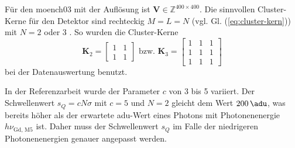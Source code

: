 \noindent
Für den \gls{moench03} mit der Auflösung  ist $\mathbf{V} \in \mathbb{Z}^{400\times 400}$. Die sinnvollen Cluster-Kerne für den Detektor sind rechteckig $M=L=N$ (vgl. Gl. (\ref{eq:cluster-kern})) mit $N = 2$ oder 3 \cite[Abschnitt 4]{cartier_micron_2014}. So wurden die Cluster-Kerne
\begin{equation}
    \mathbf{K}_{2} = \begin{bmatrix}
1 & 1\\
1 & 1
\end{bmatrix}
\text{ bzw. }
    \mathbf{K}_{3} = \begin{bmatrix}
1 & 1 & 1\\
1 & 1 & 1\\
1 & 1 & 1
\end{bmatrix}
\end{equation}
bei der Datenauswertung benutzt.

\noindent
In der Referenzarbeit wurde der Parameter $c$ von 3 bis 5 variiert. Der Schwellenwert $s_Q = cN\sigma$ mit $c=5$ und $N=2$ gleicht dem Wert $\SI{200}{\adu}$, was bereits höher als der erwartete \gls{adu}-Wert eines Photons mit Photonenenergie $h\nu_\text{Gd, M5}$ ist. Daher muss der Schwellenwert $s_Q$ im Falle der niedrigeren Photonenenergien genauer angepasst werden.